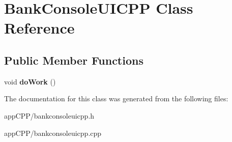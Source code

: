 \hypertarget{classBankConsoleUICPP}{\section{Bank\-Console\-U\-I\-C\-P\-P Class Reference}
\label{classBankConsoleUICPP}
}
\subsection*{Public Member Functions}
\begin{DoxyCompactItemize}
\item 
\hypertarget{classBankConsoleUICPP_a2aa27548dcdea2c93b21674439e3e23a}{void {\bfseries do\-Work} ()}\label{classBankConsoleUICPP_a2aa27548dcdea2c93b21674439e3e23a}

\end{DoxyCompactItemize}


The documentation for this class was generated from the following files\-:\begin{DoxyCompactItemize}
\item 
app\-C\-P\-P/bankconsoleuicpp.\-h\item 
app\-C\-P\-P/bankconsoleuicpp.\-cpp\end{DoxyCompactItemize}
